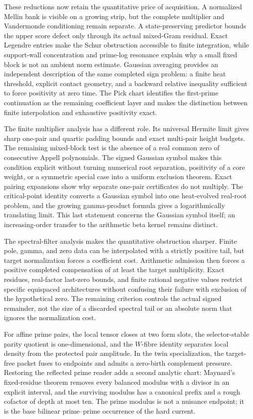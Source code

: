 \documentclass[11pt]{article}
\theoremstyle{definition}
\theoremstyle{remark}
\begin{document}
These reductions now retain the quantitative price of acquisition.  A
normalized Mellin bank is visible on a growing strip, but the complete
multiplier and Vandermonde conditioning remain separate.  A state-preserving
predictor bounds the upper score defect only through its actual mixed-Gram
residual.  Exact Legendre entries make the Schur obstruction accessible to
finite integration, while support-wall concentration and prime-log resonance
explain why a small fixed block is not an ambient norm estimate.  Gaussian
averaging provides an independent description of the same completed sign
problem: a finite heat threshold, explicit contact geometry, and a backward
relative inequality sufficient to force positivity at zero time.  The Pick
chart identifies the first-prime continuation as the remaining coefficient
layer and makes the distinction between finite interpolation and exhaustive
positivity exact.

The finite multiplier analysis has a different role.  Its universal Hermite
limit gives sharp one-pair and quartic padding bounds and exact multi-pair
height budgets.  The remaining mixed-block test is the absence of a real
common zero of consecutive Appell polynomials.  The signed Gaussian symbol
makes this condition explicit without turning numerical root separation,
positivity of a core weight, or a symmetric special case into a uniform
exclusion theorem.  Exact pairing expansions show why separate one-pair
certificates do not multiply.  The critical-point identity converts a
Gaussian symbol into one heat-evolved real-root problem, and the growing
gamma-product formula gives a logarithmically translating limit.  This
last statement concerns the Gaussian symbol itself; an increasing-order
transfer to the arithmetic beta kernel remains distinct.

The spectral-filter analysis makes the quantitative obstruction sharper.
Finite pole, gamma, and zero data can be interpolated with a strictly
positive tail, but target normalization forces a coefficient cost.
Arithmetic admission then forces a positive completed compensation of
at least the target multiplicity.  Exact residues, real-factor last-zero
bounds, and finite rational negative values restrict specific equispaced
architectures without confusing their failure with exclusion of the
hypothetical zero.  The remaining criterion controls the actual signed
remainder, not the size of a discarded spectral tail or an absolute norm
that ignores the normalization cost.

For affine prime pairs, the local tensor closes at two form slots, the
selector-stable parity quotient is one-dimensional, and the $W$-fibre
identity separates local density from the protected pair amplitude.  In the
twin specialization, the target-free packet fuses to endpoints and admits a
zero-birth complement pressure.  Restoring the reflected prime reader adds a
second analytic chart: Maynard's fixed-residue theorem removes every balanced
modulus with a divisor in an explicit interval, and the surviving modulus has
a canonical prefix and a rough cofactor of depth at most ten.  The prime
modulus is not a nuisance endpoint; it is the base bilinear prime--prime
occurrence of the hard current.
\end{document}
